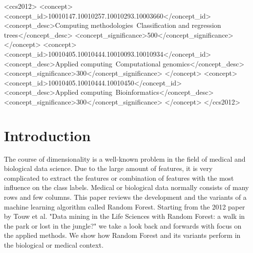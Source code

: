 \documentclass{sig-alternate-05-2015}
\begin{document}
%
%

\begin{CCSXML}
<ccs2012>
<concept>
<concept_id>10010147.10010257.10010293.10003660</concept_id>
<concept_desc>Computing methodologies~Classification and regression trees</concept_desc>
<concept_significance>500</concept_significance>
</concept>
<concept>
<concept_id>10010405.10010444.10010093.10010934</concept_id>
<concept_desc>Applied computing~Computational genomics</concept_desc>
<concept_significance>300</concept_significance>
</concept>
<concept>
<concept_id>10010405.10010444.10010450</concept_id>
<concept_desc>Applied computing~Bioinformatics</concept_desc>
<concept_significance>300</concept_significance>
</concept>
</ccs2012>
\end{CCSXML}






%
%

%
%
\printccsdesc



\section{Introduction}
The course of dimensionality is a well-known problem in the field of medical and biological data science. Due to the large amount of features, it is very complicated to extract the features or combination of features with the most influence on the class labels. Medical or biological data normally consists of many rows and few columns. This paper reviews the development and the variants of a machine learning algorithm called Random Forest. Starting from the 2012 paper by Touw et al. "Data mining in the Life Sciences with Random Forest: a walk in the park or lost in the jungle?" \cite{touw2012data} we take a look back and forwards with focus on the applied methods. We show how Random Forest and its variants perform in the biological or medical context.
\end{document}
